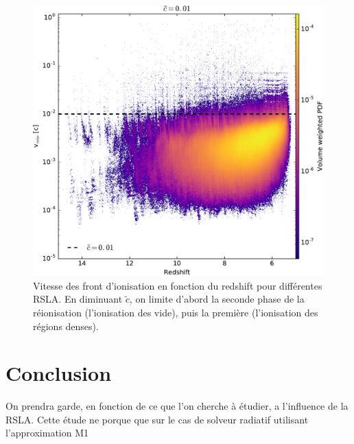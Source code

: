 \begin{figure}
		\includegraphics[height=.3\textheight]{img/04_mapreio/speedreio_z_c001.pdf} 
        \caption[Évolution de la vitesse des fronts]{Vitesse des front d'ionisation en fonction du redshift pour différentes RSLA.
        En diminuant $\tilde{c}$, on limite d'abord la seconde phase de la réionisation (l'ionisation des vide), puis la première (l'ionisation des régions denses).
        }        
 		\label{fig:vreioz}
\end{figure}




\clearpage
\section{Conclusion}

On prendra garde, en fonction de ce que l'on cherche à étudier, a l'influence de la \ac{RSLA}.
Cette étude ne porque que sur le cas de solveur radiatif utilisant l'approximation M1 %

